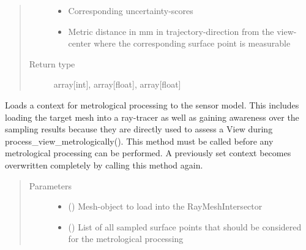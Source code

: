 \documentclass[letterpaper,10pt,english]{sphinxmanual}
\begin{document}
\begin{fulllineitems}
\begin{fulllineitems}
\begin{quote}
\begin{description}
\begin{itemize}
\item {} 
Corresponding uncertainty-scores

\item {} 
Metric distance in mm in trajectory-direction from the view-center where the corresponding surface point is measurable

\end{itemize}


\item[{Return type}] \leavevmode
array{[}int{]}, array{[}float{]}, array{[}float{]}

\end{description}\end{quote}

\end{fulllineitems}


\begin{fulllineitems}
\label{\detokenize{module_sensor_model:agiprobot_measurement.sensor_model.SensorModel.set_processing_context}}
Loads a context for metrological processing to the sensor model.
This includes loading the target mesh into a ray-tracer as well as gaining awareness over the
sampling results because they are directly used to assess a View during process\_view\_metrologically().
This method must be called before any metrological processing can be performed. A previously set
context becomes overwritten completely by calling this method again.
\begin{quote}\begin{description}
\item[{Parameters}] \leavevmode\begin{itemize}
\item {} 
 () \textendash{} Mesh-object to load into the RayMeshIntersector

\item {} 
 (\sphinxstyleliteralemphasis{{[}}\sphinxstyleliteralemphasis{{]}}) \textendash{} List of all sampled surface points that should be considered for the metrological processing


\end{itemize}
\end{description}
\end{quote}
\end{fulllineitems}
\end{fulllineitems}
\end{document}
